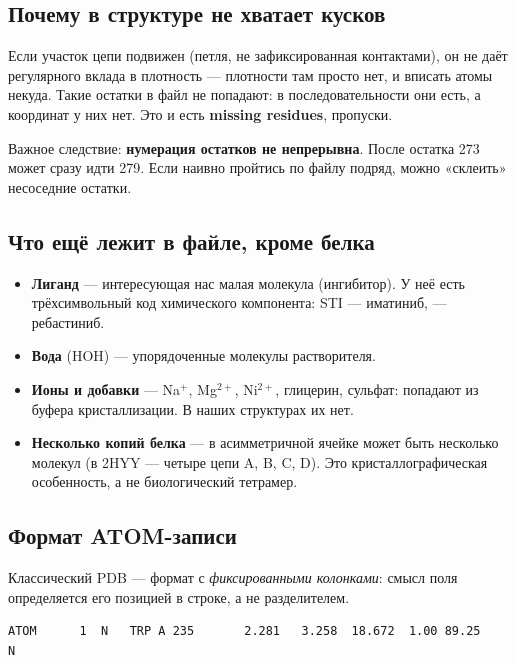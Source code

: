 \documentclass[12pt,a4paper]{article}
\newcommand{\code}[1]{{\ttfamily #1}}
\begin{document}
\subsection{Почему в структуре не хватает кусков}

Если участок цепи подвижен (петля, не зафиксированная контактами), он не даёт
регулярного вклада в плотность --- плотности там просто нет, и вписать атомы
некуда. Такие остатки в файл не попадают: в последовательности они есть, а
координат у них нет. Это и есть \textbf{missing residues}, пропуски.

Важное следствие: \textbf{нумерация остатков не непрерывна}. После остатка 273
может сразу идти 279. Если наивно пройтись по файлу подряд, можно «склеить»
несоседние остатки.

\subsection{Что ещё лежит в файле, кроме белка}

\begin{itemize}[leftmargin=*,topsep=2pt,itemsep=2pt]
\item \textbf{Лиганд} --- интересующая нас малая молекула (ингибитор). У неё есть
трёхсимвольный код химического компонента: \code{STI} --- иматиниб,
\code{919} --- ребастиниб.
\item \textbf{Вода} (\code{HOH}) --- упорядоченные молекулы растворителя.
\item \textbf{Ионы и добавки} --- Na$^+$, Mg$^{2+}$, Ni$^{2+}$, глицерин, сульфат:
попадают из буфера кристаллизации. В наших структурах их нет.
\item \textbf{Несколько копий белка} --- в асимметричной ячейке может быть
несколько молекул (в 2HYY --- четыре цепи A, B, C, D). Это кристаллографическая
особенность, а не биологический тетрамер.
\end{itemize}

\subsection{Формат ATOM-записи}

Классический PDB --- формат с \emph{фиксированными колонками}: смысл поля
определяется его позицией в строке, а не разделителем.

\begin{lstlisting}
ATOM      1  N   TRP A 235       2.281   3.258  18.672  1.00 89.25           N
\end{lstlisting}
\end{document}
